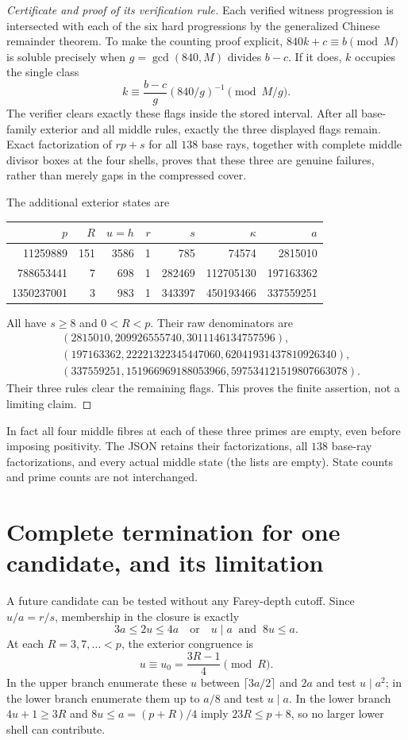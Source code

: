 \documentclass[11pt]{article}
\theoremstyle{definition}\newtheorem{definition}[theorem]{Definition}
\theoremstyle{remark}\newtheorem{remark}[theorem]{Remark}
\begin{document}
\begin{proof}[Certificate and proof of its verification rule]
Each verified witness progression is intersected with each of the six hard progressions by the generalized Chinese remainder theorem. To make the counting proof explicit, $840k+c\equiv b\pmod M$ is soluble precisely when $g=\gcd(840,M)$ divides $b-c$. If it does, $k$ occupies the single class
\[
 k\equiv\frac{b-c}{g}(840/g)^{-1}\pmod{M/g}.
\]
The verifier clears exactly these flags inside the stored interval. After all base-family exterior and all middle rules, exactly the three displayed flags remain. Exact factorization of $rp+s$ for all $138$ base rays, together with complete middle divisor boxes at the four shells, proves that these three are genuine failures, rather than merely gaps in the compressed cover.

The additional exterior states are
\begin{center}
\begin{tabular}{rrrrrrr}
\toprule
$p$&$R$&$u=h$&$r$&$s$&$\kappa$&$a$\\
\midrule
11259889&151&3586&1&785&74574&2815010\\
788653441&7&698&1&282469&112705130&197163362\\
1350237001&3&983&1&343397&450193466&337559251\\
\bottomrule
\end{tabular}
\end{center}
All have $s\ge8$ and $0<R<p$. Their raw denominators are
\begin{align*}
 &(2815010,209926555740,3011146134757596),\\
 &(197163362,22221322345447060,62041931437810926340),\\
 &(337559251,151966969188053966,597534121519807663078).
\end{align*}
Their three rules clear the remaining flags. This proves the finite assertion, not a limiting claim.
\end{proof}

In fact all four middle fibres at each of these three primes are empty, even before imposing positivity. The JSON retains their factorizations, all $138$ base-ray factorizations, and every actual middle state (the lists are empty). State counts and prime counts are not interchanged.

\section{Complete termination for one candidate, and its limitation}
A future candidate can be tested without any Farey-depth cutoff. Since $u/a=r/s$, membership in the closure is exactly
\begin{equation}\label{eq:uclosure}
 3a\le2u\le4a
 \quad\text{or}\quad
 u\mid a\ \text{ and }\ 8u\le a.
\end{equation}
At each $R=3,7,\ldots<p$, the exterior congruence is
\[
 u\equiv u_0=\frac{3R-1}{4}\pmod R.
\]
In the upper branch enumerate these $u$ between $\lceil3a/2\rceil$ and $2a$ and test $u\mid a^2$; in the lower branch enumerate them up to $a/8$ and test $u\mid a$. In the lower branch $4u+1\ge3R$ and $8u\le a=(p+R)/4$ imply $23R\le p+8$, so no larger lower shell can contribute.
\end{document}
